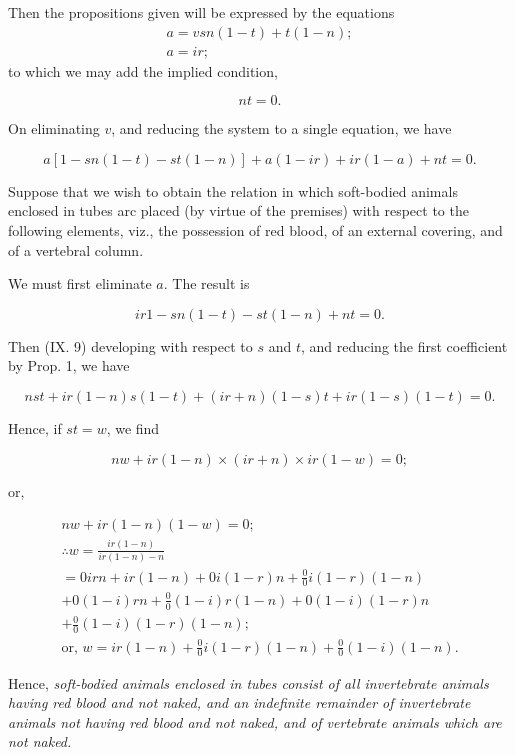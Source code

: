 \documentclass[oneside]{book}
\begin{document}
Then the propositions given will be expressed by the equations
\setcounter{equation}{0}
\begin{eqnarray}
a = vs {n(1- t) + t (1 - n)};  \\
a = ir;
\end{eqnarray}
to which we may add the implied condition,

\begin{equation}
nt = 0.
\end{equation}

On eliminating $v$, and reducing the system to a single equation,
we have

\begin{equation}
a [1-sn(1-t)-st(1-n)] + a(1-ir) + ir (1-a) + nt = 0.
\end{equation}

Suppose that we wish to obtain the relation in which soft-bodied
animals enclosed in tubes arc placed (by virtue of the
premises) with respect to the following elements, viz., the
possession of red blood, of an external covering, and of a vertebral
column.

We must first eliminate $a$. The result is

\[
ir {1 - sn(1-t) - st(1-n)} + nt=0.
\]

Then (IX. 9) developing with respect to $s$ and $t$, and reducing
the first coefficient by Prop. 1, we have

\begin{equation}
nst + ir(1-n)s(1-t) + (ir+n)(1-s)t + ir(1-s)(1-t) = 0.
\end{equation}

Hence, if $st=w$, we find

\[
nw + ir(1-n) \times (ir+n) \times ir(1-w) = 0;
\]

or,

\begin{eqnarray*}
nw + ir(1-n)(1-w) = 0; \\
\therefore w = \frac{ ir(1-n)}{ir(1-n)-n} \\
= 0irn + ir(1-n) + 0i(1-r)n + \frac{0}{0}i(1-r)(1-n) \\
+ 0(1-i)rn + \frac{0}{0}(1-i)r(1-n) + 0(1-i)(1-r)n \\
+ \frac{0}{0}(1-i)(1-r)(1-n); \\
\textrm{or, } w = ir(1-n) + \frac{0}{0}i(1-r)(1-n) + \frac{0}{0}(1-i)(1-n).
\end{eqnarray*}

Hence, \textit{soft-bodied animals enclosed in tubes consist of all
invertebrate animals having red blood and not naked, and an
indefinite remainder of invertebrate animals not having red blood and
not naked, and of vertebrate animals which are not naked.}
\end{document}
